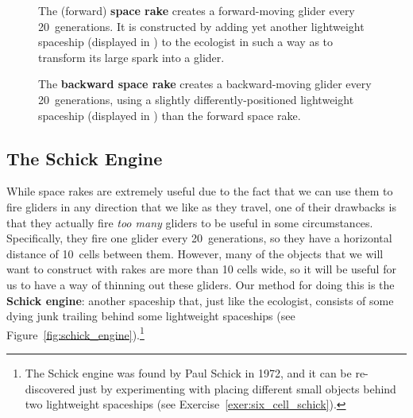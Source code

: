 \begin{figure}[!htb]
	\centering{}
	\caption{The (forward) \textbf{space rake} creates a forward-moving glider every 20~generations. It is constructed by adding yet another lightweight spaceship (displayed in ) to the ecologist in such a way as to transform its large spark into a glider.}\label{fig:space_rake}
\end{figure}

\begin{figure}[!htb]
	\centering{}
	\caption{The \textbf{backward space rake} creates a backward-moving glider every 20~generations, using a slightly differently-positioned lightweight spaceship (displayed in ) than the forward space rake.}\label{fig:back_space_rake}
\end{figure}


\subsection{The Schick Engine}\label{sec:schick_engine}

While space rakes are extremely useful due to the fact that we can use them to fire gliders in any direction that we like as they travel, one of their drawbacks is that they actually fire \emph{too many} gliders to be useful in some circumstances. Specifically, they fire one glider every 20~generations, so they have a horizontal distance of 10~cells between them. However, many of the objects that we will want to construct with rakes are more than 10 cells wide, so it will be useful for us to have a way of thinning out these gliders. Our method for doing this is the \textbf{Schick engine}: another spaceship that, just like the ecologist, consists of some dying junk trailing behind some lightweight spaceships (see Figure~\ref{fig:schick_engine}).\footnote{The Schick engine was found by Paul Schick in 1972, and it can be re-discovered just by experimenting with placing different small objects behind two lightweight spaceships (see Exercise~\ref{exer:six_cell_schick}).}

